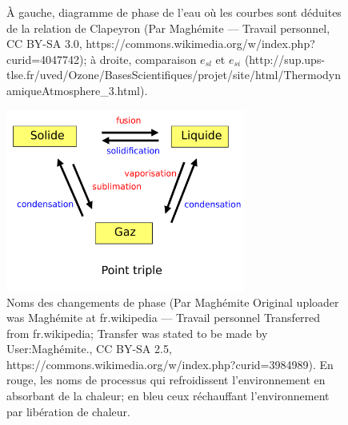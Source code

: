 \documentclass{article}
\begin{document}
\begin{figure}[ht]
  \centering
  \caption{À gauche, diagramme de phase de l'eau où les courbes sont déduites de la relation de Clapeyron (Par Maghémite — Travail personnel, CC BY-SA 3.0, https://commons.wikimedia.org/w/index.php?curid=4047742); à droite, comparaison $e_{sl}$ et $e_{si}$ (http://sup.ups-tlse.fr/uved/Ozone/BasesScientifiques/projet/site/html/ThermodynamiqueAtmosphere\_3.html).}
  \label{fig:equilibre_phases:diag_eau}
\end{figure}

\begin{figure}[ht]
  \centering
  \includegraphics[width=0.7\textwidth]{Point-triple_clapeyron}
  \caption{Noms des changements de phase (Par Maghémite Original uploader was Maghémite at fr.wikipedia — Travail personnel Transferred from fr.wikipedia; Transfer was stated to be made by User:Maghémite., CC BY-SA 2.5, https://commons.wikimedia.org/w/index.php?curid=3984989). En rouge, les noms de processus qui refroidissent l'environnement en absorbant de la chaleur; en bleu ceux réchauffant l'environnement par libération de chaleur.}
  \label{fig:equilibre_phases:vocabulaire}
\end{figure}
\FloatBarrier
\end{document}
